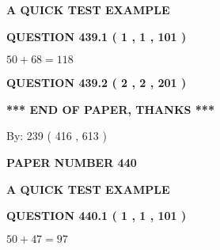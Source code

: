 \documentclass[12pt]{article}
\begin{document}
   
   
   
 \vspace{0.2in}
{\LARGE {\textbf{ A QUICK TEST EXAMPLE}}}
   
   
  
\vspace{0.2in}
  
{\textbf{\Large{QUESTION
439.1 
 ( 1 , 1 , 101 )
}}}
  
  
 
 

$ %
50 +  %
68=   %
118$
 
 
  
\vspace{0.2in}
  
{\textbf{\Large{QUESTION
439.2 
 ( 2 , 2 , 201 )
}}}
  
  
   
   
 \vspace{0.2in}
 
   
   
   
   
\vspace{1.0in} 
{\textbf{\large{ *** END OF PAPER, THANKS *** }}} 
   
   
\hspace{1.0in} By: 
 239 ( 416 ,  613 )
   
   
   
   
\newpage 
\setcounter{page}{ 
   440001 } 
   
   
   
   
 {\textbf{ \Large{ PAPER NUMBER  440  }}}
   
   
\vspace{0.2in}
   
   
   
   
   
   
 \vspace{0.2in}
{\LARGE {\textbf{ A QUICK TEST EXAMPLE}}}
   
   
  
\vspace{0.2in}
  
{\textbf{\Large{QUESTION
440.1 
 ( 1 , 1 , 101 )
}}}
  
  
 
 

$ %
50 +  %
47=   %
97$
 
 
  
\vspace{0.2in}
  
\end{document}
